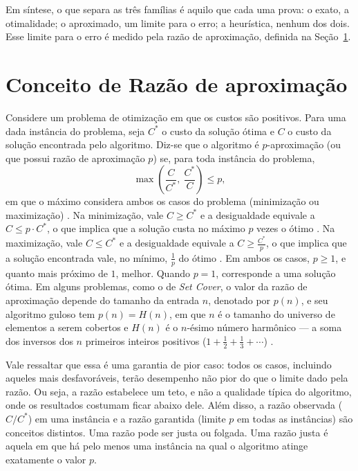 Em síntese, o que separa as três famílias é aquilo que cada uma prova: o exato, a otimalidade; o aproximado, um limite para o erro; a heurística, nenhum dos dois. Esse limite para o erro é medido pela razão de aproximação, definida na Seção~\ref{sec:razao}.

\section{Conceito de Razão de aproximação}\label{sec:razao}

Considere um problema de otimização em que os custos são positivos. Para uma dada instância do problema, seja $C^*$ o custo da solução ótima e $C$ o custo da solução encontrada pelo algoritmo. Diz-se que o algoritmo é $p$-aproximação (ou que possui razão de aproximação $p$) se, para toda instância do problema,
\begin{equation}\label{eq:razao-p}
  \max\!\left(\frac{C}{C^*},\ \frac{C^*}{C}\right) \le p,
\end{equation}
em que o máximo considera ambos os casos do problema (minimização ou maximização) \cite{cormen2012}. Na minimização, vale $C \ge C^*$ e a desigualdade equivale a $C \le p \cdot C^*$, o que implica que a solução custa no máximo $p$ vezes o ótimo \cite{cormen2012}. Na maximização, vale $C \le C^*$ e a desigualdade equivale a $C \ge \frac{C^*}{p}$, o que implica que a solução encontrada vale, no mínimo, $\frac{1}{p}$ do ótimo \cite{cormen2012}. Em ambos os casos, $p \ge 1$, e quanto mais próximo de $1$, melhor. Quando $p = 1$, corresponde a uma solução ótima. Em alguns problemas, como o de \textit{Set Cover}, o valor da razão de aproximação depende do tamanho da entrada $n$, denotado por $p(n)$, e seu algoritmo guloso tem $p(n) = H(n)$, em que $n$ é o tamanho do universo de elementos a serem cobertos e $H(n)$ é o $n$-ésimo número harmônico — a soma dos inversos dos $n$ primeiros inteiros positivos ($1 + \frac{1}{2} + \frac{1}{3} + \cdots$) \cite{cormen2012}.

Vale ressaltar que essa é uma garantia de pior caso: todos os casos, incluindo aqueles mais desfavoráveis, terão desempenho não pior do que o limite dado pela razão. Ou seja, a razão estabelece um teto, e não a qualidade típica do algoritmo, onde os resultados costumam ficar abaixo dele. Além disso, a razão observada ($C/C^*$) em uma instância e a razão garantida (limite $p$ em todas as instâncias) são conceitos distintos. Uma razão pode ser justa ou folgada. Uma razão justa é aquela em que há pelo menos uma instância na qual o algoritmo atinge exatamente o valor $p$.

